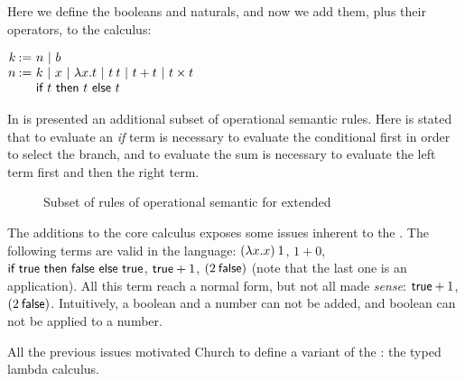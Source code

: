 \noindent Here we define the booleans and naturals, and now we add them, plus their operators, to the
calculus:
\begin{center}
$
    \begin{array}{@{ }r@{ }c@{}l}
    k &\::=&\ n\ |\ b \\
    n &\::=&\ k\ |\ \x{}\ |\ \lambda x.t\ |\ \app{t}{t}\ |\ t+t\ |\ t\times t\ \\
      &    &\ \ifterm{t}{t}{t}
    \end{array}
$
\end{center}
In  is presented an additional subset of operational semantic rules. 
Here is 
stated that to evaluate an \emph{if} term is necessary to evaluate the conditional first in order to select the
branch, and to evaluate the sum is necessary to evaluate the left term first and then the right term.

\begin{figure}
    \centering
    \caption{Subset of rules of operational semantic for extended \lambdaCalc{}}
    \label{fig:ExtUntypedLambdaCalcOpSemantic}
\end{figure}

The additions to the core calculus exposes some issues inherent to the \lambdaCalc.
The following terms are valid in the language: 
$\app{(\lambda x.x)}{1}$, $1 + 0$, $\textsf{if}\ \textsf{true}\ \textsf{then}\ \textsf{false}\ \textsf{else}\ \textsf{true}$, $\textsf{true} + 1$,
$(\app{2}{\falseTerm})$ (note that the last one is an application). All this term reach a normal form, but not all
made \emph{sense}: $\textsf{true} + 1$, $(\app{2}{\falseTerm})$.
Intuitively, a boolean and a number can not be added, and boolean can not be applied to a number. 

All the previous issues motivated Church to define a variant of the \lambdaCalc{}: the typed lambda calculus.

